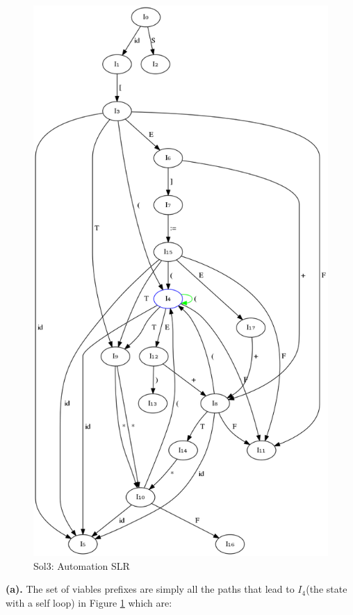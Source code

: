 \documentclass{article}
\begin{document}
\newpage
\begin{figure}[h!]
\begin{center}
\includegraphics[scale=0.5]{autoSLR.png}
\caption{Sol3: Automation SLR }
\label{auto3}
\end{center}
\end{figure}

\newpage
\textbf{(a).} The set of viables prefixes are simply all the paths that lead to $I_4$(the state with a self loop) in Figure \ref{auto3} which are:
\end{document}
